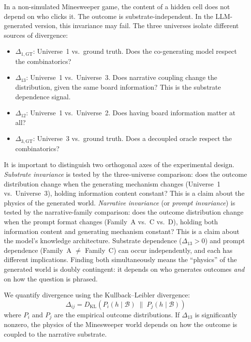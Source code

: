 \documentclass[12pt,a4paper]{article}
\begin{document}
In a non-simulated Minesweeper game, the content of a hidden cell does not depend on who clicks it. The outcome is substrate-independent. In the LLM-generated version, this invariance may fail. The three universes isolate different sources of divergence:

\begin{itemize}[nosep]
    \item $\Delta_{1,\text{GT}}$: Universe~1 vs.\ ground truth. Does the co-generating model respect the combinatorics?
    \item $\Delta_{13}$: Universe~1 vs.\ Universe~3. Does narrative coupling change the distribution, given the same board information? This is the substrate dependence signal.
    \item $\Delta_{12}$: Universe~1 vs.\ Universe~2. Does having board information matter at all?
    \item $\Delta_{3,\text{GT}}$: Universe~3 vs.\ ground truth. Does a decoupled oracle respect the combinatorics?
\end{itemize}

It is important to distinguish two orthogonal axes of the experimental design. \emph{Substrate invariance} is tested by the three-universe comparison: does the outcome distribution change when the generating mechanism changes (Universe~1 vs.\ Universe~3), holding information content constant? This is a claim about the physics of the generated world. \emph{Narrative invariance} (or \emph{prompt invariance}) is tested by the narrative-family comparison: does the outcome distribution change when the prompt format changes (Family~A vs.\ C vs.\ D), holding both information content and generating mechanism constant? This is a claim about the model's knowledge architecture. Substrate dependence ($\Delta_{13} > 0$) and prompt dependence (Family~A $\neq$ Family~C) can occur independently, and each has different implications. Finding both simultaneously means the ``physics'' of the generated world is doubly contingent: it depends on who generates outcomes \emph{and} on how the question is phrased.

We quantify divergence using the Kullback--Leibler divergence:
\begin{equation}
\Delta_{ij} = D_{\mathrm{KL}}\!\left(P_i(h \mid \mathcal{B}) \;\|\; P_j(h \mid \mathcal{B})\right)
\label{eq:substrate_dep}
\end{equation}
where $P_i$ and $P_j$ are the empirical outcome distributions. If $\Delta_{13}$ is significantly nonzero, the physics of the Minesweeper world depends on how the outcome is coupled to the narrative substrate.
\end{document}

